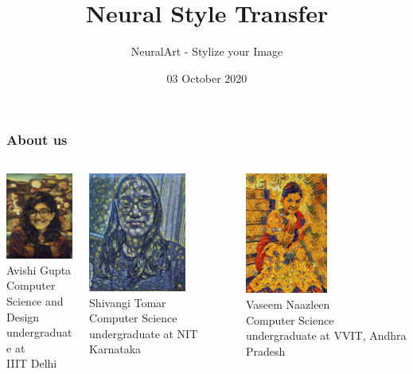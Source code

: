 \documentclass[14pt]{beamer}
\title[NST]{Neural Style Transfer}
\subtitle{NeuralArt - Stylize your Image}
\date{03 October 2020}
\begin{document}
\begin{frame}
   \titlepage
\end{frame}

\begin{frame}
    \frametitle{About us}
    \begin{columns}
    
    \begin{column}{0.33\textwidth}
            \includegraphics[width=30mm]{Avishi.jpg}\\
            \small Avishi Gupta\\
            
            \scriptsize Computer Science and\\Design undergraduate at\\IIIT Delhi
        \end{column}
        \begin{column}{0.33\textwidth}
            \includegraphics[width=32mm]{sshivangi.jpg}\\
            \small Shivangi Tomar\\
       
            \scriptsize Computer Science undergraduate at NIT Karnataka
        \end{column}
        \begin{column}{0.33\textwidth}
            \includegraphics[width=27mm]{vnaaz.jpg}\\
            \small Vaseem Naazleen\\
            \scriptsize Computer Science undergraduate at VVIT, Andhra Pradesh
        \end{column}
    \end{columns}
\end{frame}
\end{document}
